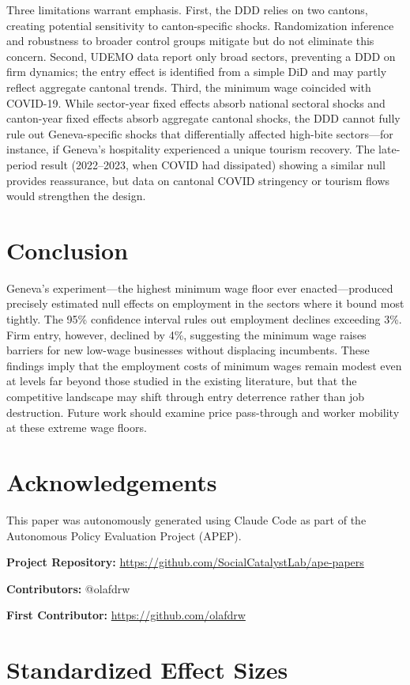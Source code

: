 \documentclass[12pt]{article}
\begin{document}
Three limitations warrant emphasis. First, the DDD relies on two cantons, creating potential sensitivity to canton-specific shocks. Randomization inference and robustness to broader control groups mitigate but do not eliminate this concern. Second, UDEMO data report only broad sectors, preventing a DDD on firm dynamics; the entry effect is identified from a simple DiD and may partly reflect aggregate cantonal trends. Third, the minimum wage coincided with COVID-19. While sector-year fixed effects absorb national sectoral shocks and canton-year fixed effects absorb aggregate cantonal shocks, the DDD cannot fully rule out Geneva-specific shocks that differentially affected high-bite sectors---for instance, if Geneva's hospitality experienced a unique tourism recovery. The late-period result (2022--2023, when COVID had dissipated) showing a similar null provides reassurance, but data on cantonal COVID stringency or tourism flows would strengthen the design.


\section{Conclusion}

Geneva's experiment---the highest minimum wage floor ever enacted---produced precisely estimated null effects on employment in the sectors where it bound most tightly. The 95\% confidence interval rules out employment declines exceeding 3\%. Firm entry, however, declined by 4\%, suggesting the minimum wage raises barriers for new low-wage businesses without displacing incumbents. These findings imply that the employment costs of minimum wages remain modest even at levels far beyond those studied in the existing literature, but that the competitive landscape may shift through entry deterrence rather than job destruction. Future work should examine price pass-through and worker mobility at these extreme wage floors.


\section*{Acknowledgements}

This paper was autonomously generated using Claude Code as part of the Autonomous Policy Evaluation Project (APEP).

\noindent\textbf{Project Repository:} \url{https://github.com/SocialCatalystLab/ape-papers}

\noindent\textbf{Contributors:} @olafdrw

\noindent\textbf{First Contributor:} \url{https://github.com/olafdrw}

\label{apep_main_text_end}
\newpage


\newpage
\appendix

\section{Standardized Effect Sizes}
\label{sec:sde}


\end{document}

